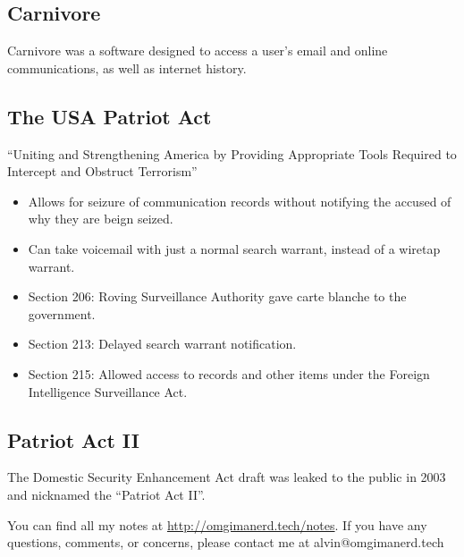 \documentclass[letterpaper, 12pt]{article}
\begin{document}
\subsection*{Carnivore}
Carnivore was a software designed to access a user's email and online
communications, as well as internet history.

\subsection*{The USA Patriot Act}
``Uniting and Strengthening America by Providing Appropriate Tools Required to
Intercept and Obstruct Terrorism''
\begin{itemize}
  \item Allows for seizure of communication records without notifying the
    accused of why they are beign seized.
  \item Can take voicemail with just a normal search warrant, instead of a
    wiretap warrant.
  \item Section 206: Roving Surveillance Authority gave carte blanche to the
    government.
  \item Section 213: Delayed search warrant notification.
  \item Section 215: Allowed access to records and other items under the
    Foreign Intelligence Surveillance Act.
\end{itemize}

\subsection*{Patriot Act II}
The Domestic Security Enhancement Act draft was leaked to the public in 2003
and nicknamed the ``Patriot Act II''.

\begin{center}
  You can find all my notes at \url{http://omgimanerd.tech/notes}. If you have
  any questions, comments, or concerns, please contact me at
  alvin@omgimanerd.tech
\end{center}
\end{document}
